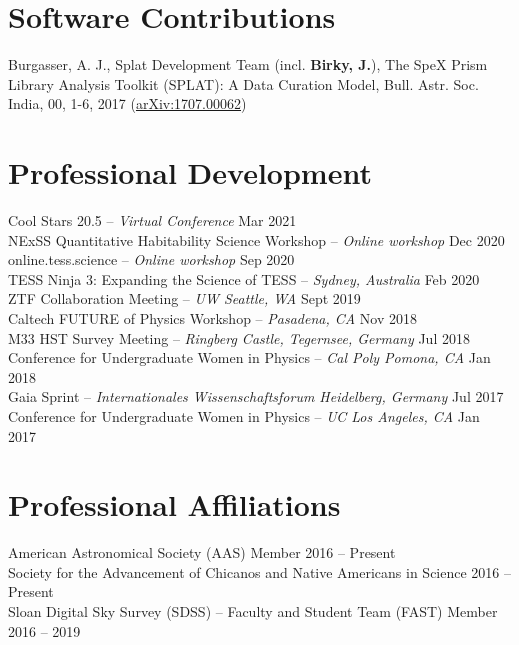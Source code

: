 \documentclass[margin,line]{resume}
\begin{document}
\begin{resume}

\section{\mysidestyle \textcolor{bcolor}{Software Contributions}}
Burgasser, A. J., Splat Development Team (incl. \textbf{Birky, J.}), The SpeX Prism Library Analysis Toolkit (SPLAT): A Data Curation Model, Bull. Astr. Soc. India, 00, 1-6, 2017 (\href{https://arxiv.org/abs/1707.00062}{arXiv:1707.00062})


\section{\mysidestyle \textcolor{bcolor}{Professional Development}}
Cool Stars 20.5 -- \textit{Virtual Conference} \hfill Mar 2021 \\
NExSS Quantitative Habitability Science Workshop -- \textit{Online workshop} \hfill Dec 2020 \\
online.tess.science -- \textit{Online workshop} \hfill Sep 2020 \\
TESS Ninja 3: Expanding the Science of TESS -- \textit{Sydney, Australia} \hfill Feb 2020 \\
ZTF Collaboration Meeting -- \textit{UW Seattle, WA} \hfill Sept 2019 \\
Caltech FUTURE of Physics Workshop -- \textit{Pasadena, CA} \hfill Nov 2018 \\
M33 HST Survey Meeting -- \textit{Ringberg Castle, Tegernsee, Germany} \hfill Jul 2018 \\
Conference for Undergraduate Women in Physics -- \textit{Cal Poly Pomona, CA}  \hfill Jan 2018 \\
Gaia Sprint -- \textit{Internationales Wissenschaftsforum Heidelberg, Germany}  \hfill Jul 2017 \\
Conference for Undergraduate Women in Physics -- \textit{UC Los Angeles, CA}  \hfill Jan 2017 



\section{\mysidestyle \textcolor{bcolor}{Professional Affiliations}}
American Astronomical Society (AAS) Member \hfill 2016 -- Present \\
Society for the Advancement of Chicanos and Native Americans in Science \hfill 2016 -- Present \\
Sloan Digital Sky Survey (SDSS) -- Faculty and Student Team (FAST) Member \hfill 2016 -- 2019 



\end{resume}
\end{document}
